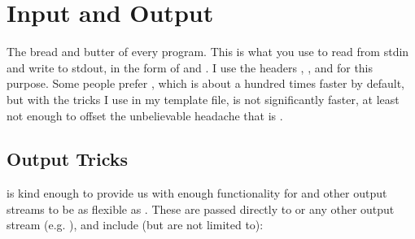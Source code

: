 \documentclass[../main]{subfiles}
\begin{document}
\section{Input and Output}

    The bread and butter of every program. This is what you use to read from stdin and write to stdout, in the form of  and . I use the headers , , and  for this purpose. Some people prefer , which is about a hundred times faster by default, but with the tricks I use in my template file, is not significantly faster, at least not enough to offset the unbelievable headache that is .\\
    
    \subsection{Output Tricks}

         is kind enough to provide us with enough functionality for  and other output streams to be as flexible as . These are passed directly to  or any other output stream (e.g. ), and include (but are not limited to):
        
\end{document}
